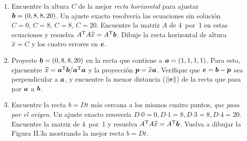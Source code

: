 \documentclass[12pt,a4paper]{article}
\newcommand\wxhat{\widehat{x}}
\newcommand{\bi}[1]{\hbox{\boldmath$#1$}}
\newcommand\1{\mbox{\,\vrule height-0.8pt depth1.0pt width2pc\,}}
\newcommand\2{\mbox{\,\vrule height-0.8pt depth1.0pt width1pc\,}}
\DeclareRobustCommand\transp{^{\mathrm{T}}}
\newcommand\bfcdot{\boldsymbol{\cdot}}
\begin{document}
\begin{enumerate}
\item Encuentre la altura $C$ de la mejor \emph{recta horizontal} para ajustar $\bi b=(0,8,8,20)$. Un ajuste exacto resolvería las ecuaciones sin solución $C=0,\, C=8, \, C=8, \, C=20$. Encuentre la matriz $A$ de 4~por~1 en estas ecuaciones y resuelva $A\transp A \wxhat=A\transp  \bi b$. Dibuje la recta horizontal de altura $\wxhat=C$ y los cuatro errores en $\bi e$.


\item Proyecte $\bi b=(0,8,8,20)$ en la recta que contiene a $\bi  a=(1,1,1,1)$.  Para esto, ejncuentre $\wxhat=\bi a\transp \bi b/\bi a\transp \bi  a$ y la proyección $\bi p=\wxhat \bi a$. Verifique que $\bi  e=\bi b- \bi p$ sea perpendicular a $\bi a$, y encuentre la menor distancia ($\|\bi e\|$) de la recta que pasa por  $\bi a$ a $\bi b$.

\item Encuentre la recta $b=Dt$ más cercana a los mismos cuatro puntos, \emph{que pasa por el origen}.  Un ajuste exacto resovería $D\bfcdot 0= 0,D\bfcdot 1=8,D\bfcdot   3=8,D\bfcdot 4=20$. Encuentre la matriz de 4~por~1 y resuelva $A\transp  A\wxhat=A\transp \bi b$. Vuelva a dibujar la Figura II.3a mostrando la mejor recta $b=Dt$. %


\end{enumerate}
\end{document}
